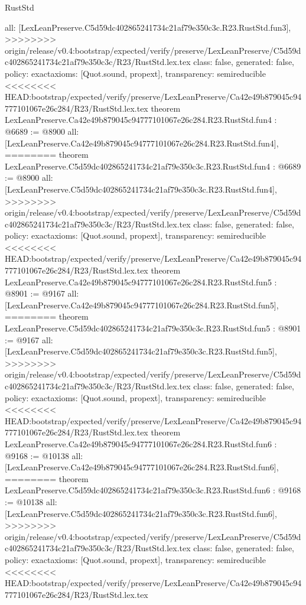 \begin{lexlean}{RustStd}
\begin{coremodule}
{\begin{coremodule}
{{{{{{{  all: [LexLeanPreserve.C5d59dc402865241734c21af79e350c3c.R23.RustStd.fun3],
>>>>>>>> origin/release/v0.4:bootstrap/expected/verify/preserve/LexLeanPreserve/C5d59dc402865241734c21af79e350c3c/R23/RustStd.lex.tex
  class: false,
  generated: false,
  policy: exact{axioms: [Quot.sound, propext]},
  transparency: semireducible
}
<<<<<<<< HEAD:bootstrap/expected/verify/preserve/LexLeanPreserve/Ca42e49b879045c94777101067e26c284/R23/RustStd.lex.tex
theorem LexLeanPreserve.Ca42e49b879045c94777101067e26c284.R23.RustStd.fun4 : @6689 := @8900 {
  all: [LexLeanPreserve.Ca42e49b879045c94777101067e26c284.R23.RustStd.fun4],
========
theorem LexLeanPreserve.C5d59dc402865241734c21af79e350c3c.R23.RustStd.fun4 : @6689 := @8900 {
  all: [LexLeanPreserve.C5d59dc402865241734c21af79e350c3c.R23.RustStd.fun4],
>>>>>>>> origin/release/v0.4:bootstrap/expected/verify/preserve/LexLeanPreserve/C5d59dc402865241734c21af79e350c3c/R23/RustStd.lex.tex
  class: false,
  generated: false,
  policy: exact{axioms: [Quot.sound, propext]},
  transparency: semireducible
}
<<<<<<<< HEAD:bootstrap/expected/verify/preserve/LexLeanPreserve/Ca42e49b879045c94777101067e26c284/R23/RustStd.lex.tex
theorem LexLeanPreserve.Ca42e49b879045c94777101067e26c284.R23.RustStd.fun5 : @8901 := @9167 {
  all: [LexLeanPreserve.Ca42e49b879045c94777101067e26c284.R23.RustStd.fun5],
========
theorem LexLeanPreserve.C5d59dc402865241734c21af79e350c3c.R23.RustStd.fun5 : @8901 := @9167 {
  all: [LexLeanPreserve.C5d59dc402865241734c21af79e350c3c.R23.RustStd.fun5],
>>>>>>>> origin/release/v0.4:bootstrap/expected/verify/preserve/LexLeanPreserve/C5d59dc402865241734c21af79e350c3c/R23/RustStd.lex.tex
  class: false,
  generated: false,
  policy: exact{axioms: [Quot.sound, propext]},
  transparency: semireducible
}
<<<<<<<< HEAD:bootstrap/expected/verify/preserve/LexLeanPreserve/Ca42e49b879045c94777101067e26c284/R23/RustStd.lex.tex
theorem LexLeanPreserve.Ca42e49b879045c94777101067e26c284.R23.RustStd.fun6 : @9168 := @10138 {
  all: [LexLeanPreserve.Ca42e49b879045c94777101067e26c284.R23.RustStd.fun6],
========
theorem LexLeanPreserve.C5d59dc402865241734c21af79e350c3c.R23.RustStd.fun6 : @9168 := @10138 {
  all: [LexLeanPreserve.C5d59dc402865241734c21af79e350c3c.R23.RustStd.fun6],
>>>>>>>> origin/release/v0.4:bootstrap/expected/verify/preserve/LexLeanPreserve/C5d59dc402865241734c21af79e350c3c/R23/RustStd.lex.tex
  class: false,
  generated: false,
  policy: exact{axioms: [Quot.sound, propext]},
  transparency: semireducible
}
<<<<<<<< HEAD:bootstrap/expected/verify/preserve/LexLeanPreserve/Ca42e49b879045c94777101067e26c284/R23/RustStd.lex.tex
}}}}}}}}}
\end{coremodule}}
\end{coremodule}
\end{lexlean}
